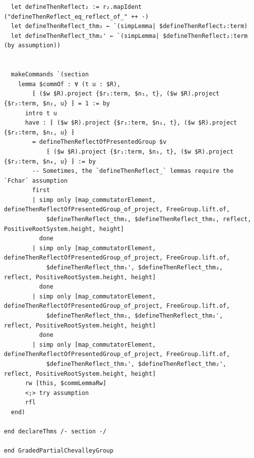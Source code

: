 \begin{Verbatim}
  let defineThenReflect₂ := r₂.mapIdent ("defineThenReflect_eq_reflect_of_" ++ ·)
  let defineThenReflect_thm₂ ← `(simpLemma| $defineThenReflect₂:term)
  let defineThenReflect_thm₂' ← `(simpLemma| $defineThenReflect₂:term (by assumption))


  makeCommands `(section
    lemma $commOf : ∀ (t u : $R),
        ⁅ ($w $R).project {$r₁:term, $n₁, t}, ($w $R).project {$r₂:term, $n₂, u} ⁆ = 1 := by
      intro t u
      have : ⁅ ($w $R).project {$r₁:term, $n₁, t}, ($w $R).project {$r₂:term, $n₂, u} ⁆
        = defineThenReflectOfPresentedGroup $v
            ⁅ ($w $R).project {$r₁:term, $n₃, t}, ($w $R).project {$r₂:term, $n₄, u} ⁆ := by
        -- Sometimes, the `defineThenReflect_` lemmas require the `Fchar` assumption
        first
        | simp only [map_commutatorElement, defineThenReflectOfPresentedGroup_of_project, FreeGroup.lift.of,
            $defineThenReflect_thm₁, $defineThenReflect_thm₂, reflect, PositiveRootSystem.height, height]
          done
        | simp only [map_commutatorElement, defineThenReflectOfPresentedGroup_of_project, FreeGroup.lift.of,
            $defineThenReflect_thm₁', $defineThenReflect_thm₂, reflect, PositiveRootSystem.height, height]
          done
        | simp only [map_commutatorElement, defineThenReflectOfPresentedGroup_of_project, FreeGroup.lift.of,
            $defineThenReflect_thm₁, $defineThenReflect_thm₂', reflect, PositiveRootSystem.height, height]
          done
        | simp only [map_commutatorElement, defineThenReflectOfPresentedGroup_of_project, FreeGroup.lift.of,
            $defineThenReflect_thm₁', $defineThenReflect_thm₂', reflect, PositiveRootSystem.height, height]
      rw [this, $commLemmaRw]
      <;> try assumption
      rfl
  end)

end declareThms /- section -/

end GradedPartialChevalleyGroup
\end{Verbatim}
